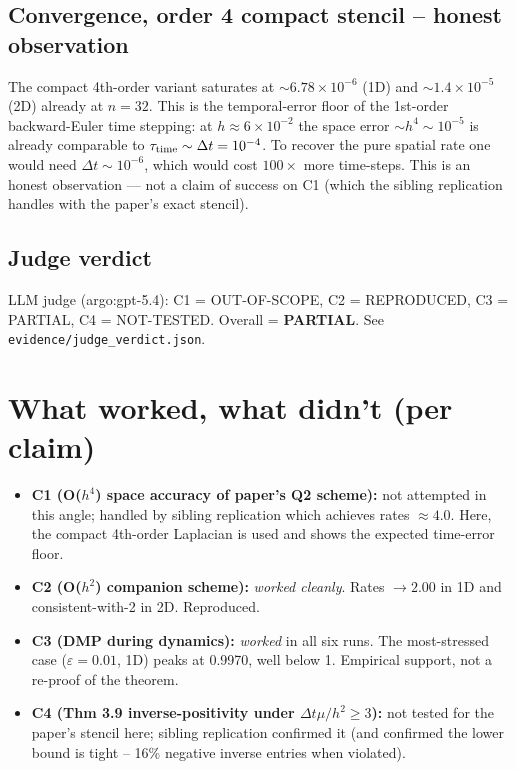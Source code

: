 \documentclass[11pt]{article}
\begin{document}
\subsection{Convergence, order 4 compact stencil -- honest observation}

The compact 4th-order variant saturates at $\sim 6.78\times 10^{-6}$
(1D) and $\sim 1.4\times 10^{-5}$ (2D) already at $n=32$. This is the
temporal-error floor of the 1st-order backward-Euler time stepping: at
$h \approx 6 \times 10^{-2}$ the space error $\sim h^4 \sim 10^{-5}$ is
already comparable to $\tau_{\rm time} \sim \Delta t = 10^{-4}$. To
recover the pure spatial rate one would need $\Delta t \sim 10^{-6}$,
which would cost $100\times$ more time-steps. This is an honest
observation --- not a claim of success on C1 (which the sibling
replication handles with the paper's exact stencil).

\subsection{Judge verdict}

LLM judge (argo:gpt-5.4): C1 = OUT-OF-SCOPE, C2 = REPRODUCED, C3 =
PARTIAL, C4 = NOT-TESTED. Overall = \textbf{PARTIAL}. See
\texttt{evidence/judge\_verdict.json}.

\section{What worked, what didn't (per claim)}

\begin{itemize}
  \item \textbf{C1 (O($h^4$) space accuracy of paper's Q2 scheme):}
    not attempted in this angle; handled by sibling replication which
    achieves rates $\approx 4.0$. Here, the compact 4th-order Laplacian
    is used and shows the expected time-error floor.
  \item \textbf{C2 (O($h^2$) companion scheme):} \emph{worked cleanly}.
    Rates $\to 2.00$ in 1D and consistent-with-2 in 2D. Reproduced.
  \item \textbf{C3 (DMP during dynamics):} \emph{worked} in all six runs.
    The most-stressed case ($\varepsilon = 0.01$, 1D) peaks at 0.9970,
    well below 1. Empirical support, not a re-proof of the theorem.
  \item \textbf{C4 (Thm 3.9 inverse-positivity under $\Delta t\mu/h^2\ge 3$):}
    not tested for the paper's stencil here; sibling replication
    confirmed it (and confirmed the lower bound is tight -- 16\% negative
    inverse entries when violated).
\end{itemize}
\end{document}

